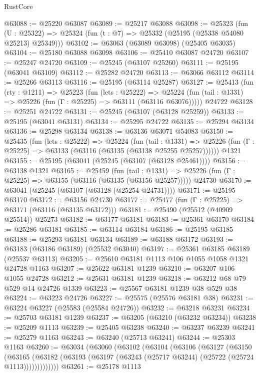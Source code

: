 \begin{lexlean}{RustCore}
\begin{coremodule}
@63088 := @25220 @63087
@63089 := @25217 @63088
@63098 := @25323
    (fun (U : @25322) => @25324 (fun (t : @7) => @25332 (@25195 (@25338 @54080 @25213) @25349)))
@63102 := @63063 (@63089 @63098) (@25405 @63035)
@63104 := @25180 @63088 @63098
@63106 := @25410 @63087 @24720
@63107 := @25247 @24720
@63109 := @25245 (@63107 @25260)
@63111 := @25195 (@63041 @63109)
@63112 := @25282 @24720
@63113 := @63066 @63112
@63114 := @25266 @63113
@63116 := @25195 (@63114 @25287)
@63127 := @25413
    (fun (rty : @1211) =>
    @25223
      (fun (lets : @25222) =>
      @25224 (fun (tail : @1331) => @25226 (fun (Γ : @25225) => @63111 (@63116 @63076)))))
    @24722
@63128 := @25251 @24722
@63131 := @25245 (@63107 (@63128 @25259))
@63133 := @25195 (@63041 @63131)
@63134 := @25295 @24722
@63135 := @25294 @63134
@63136 := @25298 @63134
@63138 := @63136 @63071 @54083
@63150 := @25435
    (fun (lets : @25222) =>
    @25224
      (fun (tail : @1331) =>
      @25226 (fun (Γ : @25225) => @63133 (@63116 (@63135 (@63138 @25255 @25257))))))
    @1321
@63155 := @25195 (@63041 (@25245 (@63107 (@63128 @25461))))
@63156 := @63138 @1321
@63165 := @25459
    (fun (tail : @1331) => @25226 (fun (Γ : @25225) => @63155 (@63116 (@63135 (@63156 @25257)))))
    @24730
@63170 := @63041 (@25245 (@63107 (@63128 (@25254 @24731))))
@63171 := @25195 @63170
@63172 := @63156 @24730
@63177 := @25477 (fun (Γ : @25225) => @63171 (@63116 (@63135 @63172)))
@63181 := @25490 (@25512 (@40909 @25514)) @25273
@63182 := @63177 @63181
@63183 := @25361 @63170
@63184 := @25286 @63181
@63185 := @63114 @63184
@63186 := @25195 @63185
@63188 := @25293 @63181 @63134
@63189 := @63188 @63172
@63193 := @63183 (@63186 @63189) (@25532 @63040)
@63197 := @25361 @63185 @63189 (@25537 @63113)
@63205 := @25610 @63181 @1113 @106 @1055 @1058 @1321 @24728 @1163
@63207 := @25622 @63181 @1239
@63210 := @63207 @106 @1055 @24728
@63212 := @25631 @63181 @1239
@63218 := @63212 @68 @79 @529 @14 @24726 @1339
@63223 := @25567 @63181 @1239 @38 @529 @38
@63224 := @63223 @24726
@63227 := @25575 (@25576 @63181 @38)
@63231 := @63224 @63227 (@25583 (@25584 @24726))
@63232 := @63218 @63231
@63234 := @25703 @63181 @1239
@63237 := @63205 (@63210 (@63232 @63234))
@63238 := @25209 @1113
@63239 := @25405 @63238
@63240 := @63237 @63239
@63241 := @25279 @1163
@63243 := @63240 (@25713 @63241)
@63244 := @25303 @1163
@63260 := @63034
    (@63060
      (@63102
        (@63104
          (@63106
            (@63127
              (@63150
                (@63165
                  (@63182 (@63193 (@63197 (@63243 (@25717 @63244) (@25722 (@25724 @1113)))))))))))))
@63261 := @25178 @1113

\end{coremodule}
\end{lexlean}
